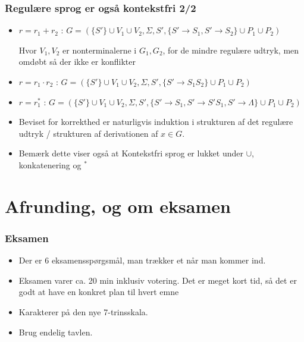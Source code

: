 \documentclass{beamer}
\begin{document}
\begin{frame}
\frametitle{Regulære sprog er også kontekstfri 2/2}
\begin{itemize}[<+->]
\item $r = r_1+r_2$ : $G=(\{S'\}\cup V_1 \cup V_2, \Sigma, S', \{S'\rightarrow S_1, S'\rightarrow S_2\} \cup P_1 \cup P_2)$

  Hvor $V_1, V_2$ er nonterminalerne i $G_1, G_2$, for de mindre regulære udtryk, men \alert{omdøbt så der ikke er konflikter}
\item $r = r_1\cdot r_2$ : $G=(\{S'\}\cup V_1 \cup V_2,\Sigma, S', \{S'\rightarrow S_1S_2\} \cup P_1 \cup P_2)$
\item $r = r_1^*$ : $G=(\{S'\}\cup V_1 \cup V_2,\Sigma, S', \{S'\rightarrow S_1, S'\rightarrow S'S_1, S' \rightarrow \Lambda\} \cup P_1 \cup P_2)$
\item Beviset for korrekthed er naturligvis induktion i strukturen af det regulære udtryk / strukturen af derivationen af $x\in G$.
\item Bemærk dette viser også at Kontekstfri sprog er lukket under $\cup$, konkatenering og ${}^*$

\end{itemize}
\end{frame}
\section{Afrunding, og om eksamen}
\begin{frame}
\frametitle{Eksamen}
\begin{itemize}
\item Der er 6 eksamensspørgsmål, man trækker et når man kommer ind.
\item Eksamen varer ca. 20 min inklusiv votering. Det er meget kort
  tid, så det er godt at have en konkret plan til hvert emne
\item Karakterer på den nye 7-trinsskala.
\item Brug endelig tavlen.
\end{itemize}
\end{frame}
\end{document}
